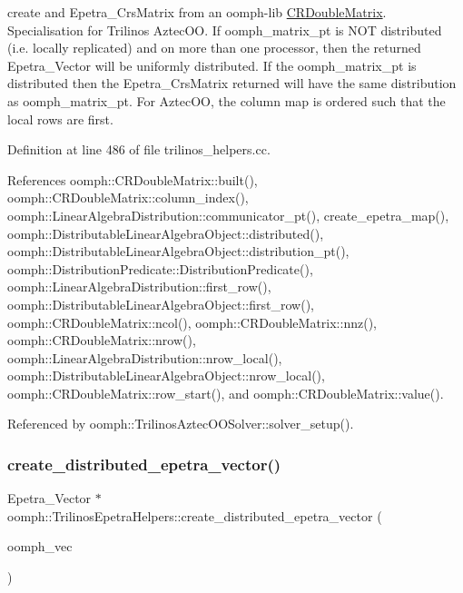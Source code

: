 create and Epetra\+\_\+\+Crs\+Matrix from an oomph-\/lib \hyperlink{classoomph_1_1CRDoubleMatrix}{C\+R\+Double\+Matrix}. Specialisation for Trilinos Aztec\+OO. If oomph\+\_\+matrix\+\_\+pt is N\+OT distributed (i.\+e. locally replicated) and on more than one processor, then the returned Epetra\+\_\+\+Vector will be uniformly distributed. If the oomph\+\_\+matrix\+\_\+pt is distributed then the Epetra\+\_\+\+Crs\+Matrix returned will have the same distribution as oomph\+\_\+matrix\+\_\+pt. For Aztec\+OO, the column map is ordered such that the local rows are first. 



Definition at line 486 of file trilinos\+\_\+helpers.\+cc.



References oomph\+::\+C\+R\+Double\+Matrix\+::built(), oomph\+::\+C\+R\+Double\+Matrix\+::column\+\_\+index(), oomph\+::\+Linear\+Algebra\+Distribution\+::communicator\+\_\+pt(), create\+\_\+epetra\+\_\+map(), oomph\+::\+Distributable\+Linear\+Algebra\+Object\+::distributed(), oomph\+::\+Distributable\+Linear\+Algebra\+Object\+::distribution\+\_\+pt(), oomph\+::\+Distribution\+Predicate\+::\+Distribution\+Predicate(), oomph\+::\+Linear\+Algebra\+Distribution\+::first\+\_\+row(), oomph\+::\+Distributable\+Linear\+Algebra\+Object\+::first\+\_\+row(), oomph\+::\+C\+R\+Double\+Matrix\+::ncol(), oomph\+::\+C\+R\+Double\+Matrix\+::nnz(), oomph\+::\+C\+R\+Double\+Matrix\+::nrow(), oomph\+::\+Linear\+Algebra\+Distribution\+::nrow\+\_\+local(), oomph\+::\+Distributable\+Linear\+Algebra\+Object\+::nrow\+\_\+local(), oomph\+::\+C\+R\+Double\+Matrix\+::row\+\_\+start(), and oomph\+::\+C\+R\+Double\+Matrix\+::value().



Referenced by oomph\+::\+Trilinos\+Aztec\+O\+O\+Solver\+::solver\+\_\+setup().

\mbox{\label{namespaceoomph_1_1TrilinosEpetraHelpers_a914dd010ddb4896a7af801945a2db912}} 
\subsubsection{\texorpdfstring{create\+\_\+distributed\+\_\+epetra\+\_\+vector()}{create\_distributed\_epetra\_vector()}\hspace{0.1cm}{\footnotesize\ttfamily [1/2]}}
{\footnotesize\ttfamily Epetra\+\_\+\+Vector $\ast$ oomph\+::\+Trilinos\+Epetra\+Helpers\+::create\+\_\+distributed\+\_\+epetra\+\_\+vector (\begin{DoxyParamCaption}\item[{const \hyperlink{classoomph_1_1DoubleVector}{Double\+Vector} \&}]{oomph\+\_\+vec }\end{DoxyParamCaption})}



